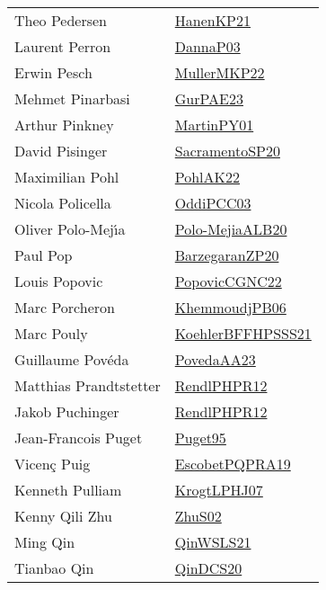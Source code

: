 {\begin{longtable}{p{4cm}p{20cm}}
Theo Pedersen & \href{papers/HanenKP21.pdf}{HanenKP21}\cite{HanenKP21} \\
Laurent Perron & \href{papers/DannaP03.pdf}{DannaP03}\cite{DannaP03} \\
Erwin Pesch & \href{articles/MullerMKP22.pdf}{MullerMKP22}\cite{MullerMKP22} \\
Mehmet Pinarbasi & \href{articles/GurPAE23.pdf}{GurPAE23}\cite{GurPAE23} \\
Arthur Pinkney & \href{articles/MartinPY01.pdf}{MartinPY01}\cite{MartinPY01} \\
David Pisinger & \href{articles/SacramentoSP20.pdf}{SacramentoSP20}\cite{SacramentoSP20} \\
Maximilian Pohl & \href{articles/PohlAK22.pdf}{PohlAK22}\cite{PohlAK22} \\
Nicola Policella & \href{papers/OddiPCC03.pdf}{OddiPCC03}\cite{OddiPCC03} \\
Oliver Polo{-}Mej{\'{\i}}a & \href{}{Polo-MejiaALB20}\cite{Polo-MejiaALB20} \\
Paul Pop & \href{papers/BarzegaranZP20.pdf}{BarzegaranZP20}\cite{BarzegaranZP20} \\
Louis Popovic & \href{papers/PopovicCGNC22.pdf}{PopovicCGNC22}\cite{PopovicCGNC22} \\
Marc Porcheron & \href{papers/KhemmoudjPB06.pdf}{KhemmoudjPB06}\cite{KhemmoudjPB06} \\
Marc Pouly & \href{articles/KoehlerBFFHPSSS21.pdf}{KoehlerBFFHPSSS21}\cite{KoehlerBFFHPSSS21} \\
Guillaume Pov{\'{e}}da & \href{papers/PovedaAA23.pdf}{PovedaAA23}\cite{PovedaAA23} \\
Matthias Prandtstetter & \href{papers/RendlPHPR12.pdf}{RendlPHPR12}\cite{RendlPHPR12} \\
Jakob Puchinger & \href{papers/RendlPHPR12.pdf}{RendlPHPR12}\cite{RendlPHPR12} \\
Jean{-}Francois Puget & \href{papers/Puget95.pdf}{Puget95}\cite{Puget95} \\
Vicen{\c{c}} Puig & \href{articles/EscobetPQPRA19.pdf}{EscobetPQPRA19}\cite{EscobetPQPRA19} \\
Kenneth Pulliam & \href{papers/KrogtLPHJ07.pdf}{KrogtLPHJ07}\cite{KrogtLPHJ07} \\
Kenny Qili Zhu & \href{papers/ZhuS02.pdf}{ZhuS02}\cite{ZhuS02} \\
Ming Qin & \href{articles/QinWSLS21.pdf}{QinWSLS21}\cite{QinWSLS21} \\
Tianbao Qin & \href{articles/QinDCS20.pdf}{QinDCS20}\cite{QinDCS20} \\

\end{longtable}}
